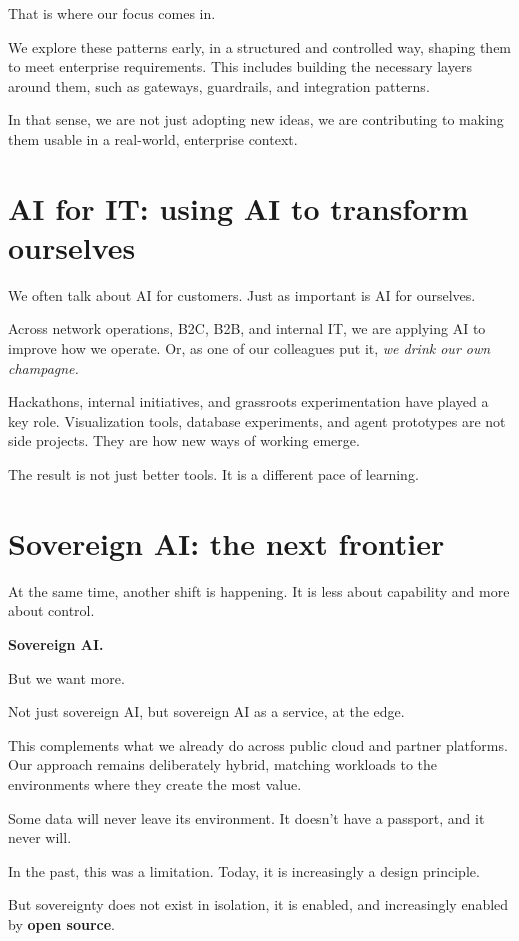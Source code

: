 \documentclass[11pt]{article}
\begin{document}
That is where our focus comes in.

We explore these patterns early, in a structured and controlled way, shaping them to meet enterprise requirements. This includes building the necessary layers around them, such as gateways, guardrails, and integration patterns.

In that sense, we are not just adopting new ideas, we are contributing to making them usable in a real-world, enterprise context.

\section*{AI for IT: using AI to transform ourselves}

We often talk about AI for customers. Just as important is AI for ourselves.

Across network operations, B2C, B2B, and internal IT, we are applying AI to improve how we operate. Or, as one of our colleagues put it, \textit{we drink our own champagne.}

Hackathons, internal initiatives, and grassroots experimentation have played a key role. Visualization tools, database experiments, and agent prototypes are not side projects. They are how new ways of working emerge.

The result is not just better tools. It is a different pace of learning.

\section*{Sovereign AI: the next frontier}

At the same time, another shift is happening. It is less about capability and more about control.

\textbf{Sovereign AI.}

But we want more.

Not just sovereign AI, but sovereign AI as a service, at the edge.

This complements what we already do across public cloud and partner platforms. Our approach remains deliberately hybrid, matching workloads to the environments where they create the most value.

Some data will never leave its environment. It doesn’t have a passport, and it never will.

In the past, this was a limitation. Today, it is increasingly a design principle.

But sovereignty does not exist in isolation, it is enabled, and increasingly enabled by \textbf{open source}.
\end{document}

